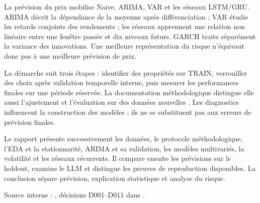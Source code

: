 La prévision du prix mobilise Naive, ARIMA, VAR et les réseaux LSTM/GRU. ARIMA décrit la dépendance de la moyenne après différenciation ; VAR étudie les retards conjoints des rendements ; les réseaux apprennent une relation non linéaire entre une fenêtre passée et dix niveaux futurs. GARCH traite séparément la variance des innovations. Une meilleure représentation du risque n’équivaut donc pas à une meilleure prévision de prix.



La démarche suit trois étapes : identifier des propriétés sur TRAIN, verrouiller des choix après validation temporelle interne, puis mesurer les performances finales sur une période réservée. La documentation méthodologique distingue elle aussi l’ajustement et l’évaluation sur des données nouvelles \cite{R2}. Les diagnostics influencent la construction des modèles ; ils ne se substituent pas aux erreurs de prévision finales.



Le rapport présente successivement les données, le protocole méthodologique, l’EDA et la stationnarité, ARIMA et sa validation, les modèles multivariés, la volatilité et les réseaux récurrents. Il compare ensuite les prévisions sur le holdout, examine le LLM et distingue les preuves de reproduction disponibles. La conclusion sépare prévision, explication statistique et analyse du risque.



Source interne : , décisions D001--D011 dans .
